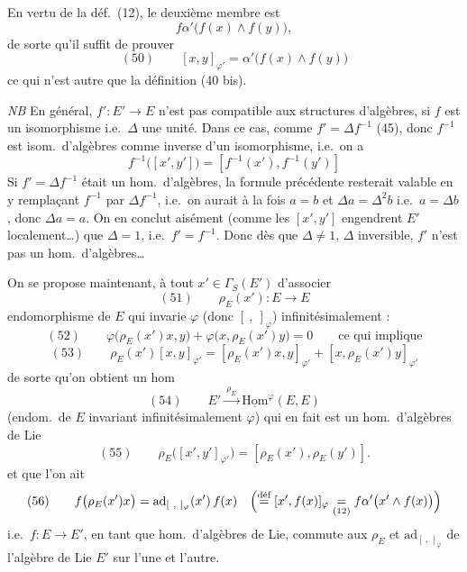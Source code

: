 \documentclass[11pt,a4paper]{article}
\begin{document}
En vertu de la déf.\ (12), le deuxième membre est
\[
  f\alpha'\bigl(f(x) \wedge f(y)\bigr) ,
\]
de sorte qu'il suffit de prouver
\[
  (50) \qquad [x, y]_{\varphi'} = \alpha'\bigl(f(x) \wedge f(y)\bigr)
\]
ce qui n'est autre que la définition (40 bis).

\emph{NB} En général, $f' : E' \to E$ n'est pas compatible aux structures
d'algèbres,  si $f$ est un isomorphisme i.e.\ $\Delta$ une unité.
Dans ce cas, comme $f' = \Delta f^{-1}$ (45), donc $f^{-1}$ est \struck{\ill{}} isom.\
d'algèbres comme inverse d'un isomorphisme, i.e.\ on a
\[
  f^{-1}\bigl([x', y']\bigr) = [f^{-1}(x'), f^{-1}(y')]
\]
Si $f' = \Delta f^{-1}$ était un hom.\ d'algèbres, la \struck{\ill{}} formule
précédente resterait valable en y remplaçant $f^{-1}$ par $\Delta f^{-1}$, i.e.\ on
aurait à la fois $a = b$ et $\Delta a = \Delta^2 b$ i.e.\ $a = \Delta b$,
donc $\Delta a = a$. \struck{Si} On en conclut aisément (comme les $[x', y']$
engendrent $E'$ localement\ldots) que $\Delta = 1$, \struck{Donc} i.e.\
$f' = f^{-1}$. Donc dès que $\Delta \neq 1$, $\Delta$ inversible, $f'$ n'est pas un
hom.\ d'algèbres\ldots

On se propose maintenant, à tout $x' \in \Gamma_S(E')$ d'associer
\[
  (51) \qquad \rho_E(x') : E \longrightarrow E
\]
 endomorphisme de $E$ qui invarie $\varphi$ (donc
$[\ ,\ ]_{\varphi}$) infinitésimalement :
\[
  (52) \qquad \varphi\bigl(\rho_E(x')x, y\bigr) + \varphi\bigl(x, \rho_E(x')y\bigr) = 0 \qquad \text{ce qui implique}
\]
\[
  (53) \qquad \rho_E(x')[x, y]_{\varphi'} = [\rho_E(x')x, y]_{\varphi'} + [x, \rho_E(x')y]_{\varphi'}
\]
de sorte qu'on obtient un hom
\[
  (54) \qquad E' \xrightarrow{\ \rho_E\ } \underline{\mathrm{Hom}}^{\varphi}(E, E)
\]
(endom.\ de $E$ invariant infinitésimalement $\varphi$)
qui en fait est un hom.\ d'algèbres de Lie
\[
  (55) \qquad \rho_E\bigl([x', y']_{\varphi'}\bigr) = [\rho_E(x'), \rho_E(y')] .
\]
 et que l'on ait
\[
  (56) \qquad f\bigl(\rho_E(x')x\bigr) = \mathrm{ad}_{[\ ,\ ]_{\varphi}}(x')\, f(x) \quad
  \Bigl(\overset{\text{déf}}{=} [x', f(x)]_{\varphi} \underset{(12)}{=} f\alpha'\bigl(x' \wedge f(x)\bigr)\Bigr)
\]
i.e.\ $f : E \to E'$, en tant que hom.\ d'algèbres de Lie, commute aux
 $\rho_E$ et $\mathrm{ad}_{[\ ,\ ]_{\varphi}}$ de l'algèbre de Lie
$E'$ sur l'une et l'autre.
\end{document}
